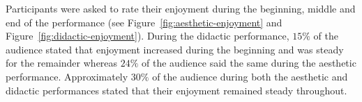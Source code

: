 \documentclass{sig-alternate}
\begin{document}
Participants were asked to rate their enjoyment during the beginning, middle and end of the performance (see Figure~\ref{fig:aesthetic-enjoyment} and Figure~\ref{fig:didactic-enjoyment}). During the didactic performance, $15\%$ of the audience stated that enjoyment increased during the beginning and was steady for the remainder whereas $24\%$ of the audience said the same during the aesthetic performance. Approximately $30\%$ of the audience during both the aesthetic and didactic performances stated that their enjoyment remained steady throughout.






\end{document}
